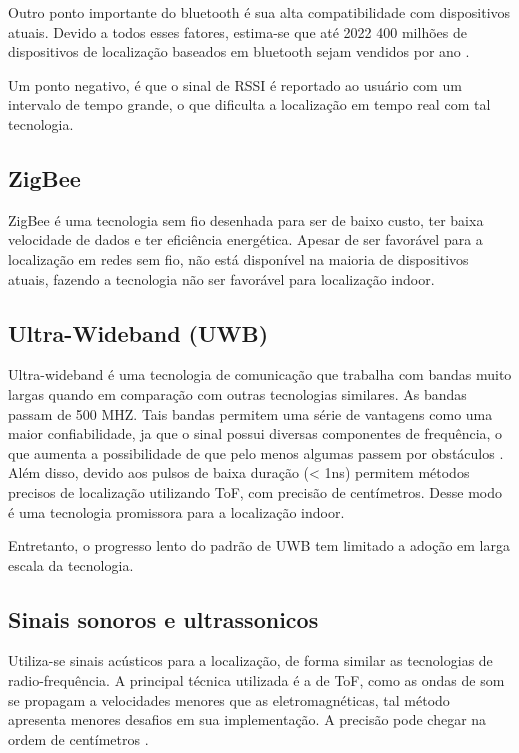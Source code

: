 Outro ponto importante  do bluetooth é sua alta compatibilidade com dispositivos atuais. Devido a todos esses fatores, estima-se que até 2022 400 milhões de dispositivos de localização baseados em bluetooth sejam vendidos por ano \cite{art9}.

Um ponto negativo, é que o sinal de RSSI é reportado ao usuário com um intervalo de tempo grande, o que dificulta a localização em tempo real com tal tecnologia.

\subsection{ZigBee}

ZigBee é uma tecnologia sem fio desenhada para ser de baixo custo, ter baixa velocidade de dados e ter eficiência energética. Apesar de ser favorável para a localização em redes sem fio, não está disponível na maioria de dispositivos atuais, fazendo a tecnologia não ser favorável para localização indoor. \cite{art2}

\subsection{Ultra-Wideband (UWB)}
Ultra-wideband é uma tecnologia de comunicação que trabalha com bandas muito largas quando em comparação com outras tecnologias similares. As bandas passam de 500 MHZ. Tais bandas permitem uma série de vantagens como uma maior confiabilidade, ja que o sinal possui diversas componentes de frequência, o que aumenta a possibilidade de que pelo menos algumas passem por obstáculos \cite{art10}.
Além disso, devido aos pulsos de baixa duração (< 1ns) permitem métodos precisos de localização utilizando ToF, com precisão de centímetros. Desse modo é uma tecnologia promissora para a localização indoor.

Entretanto, o progresso lento do padrão de UWB tem limitado a adoção em larga escala da tecnologia.


\subsection{Sinais sonoros e ultrassonicos}

Utiliza-se sinais acústicos para a localização, de forma similar as tecnologias de radio-frequência.
A principal técnica utilizada é a de ToF, como as ondas de som se propagam a velocidades menores que as eletromagnéticas, tal método apresenta menores desafios em sua implementação. A precisão pode chegar na ordem de centímetros \cite{art11}.

